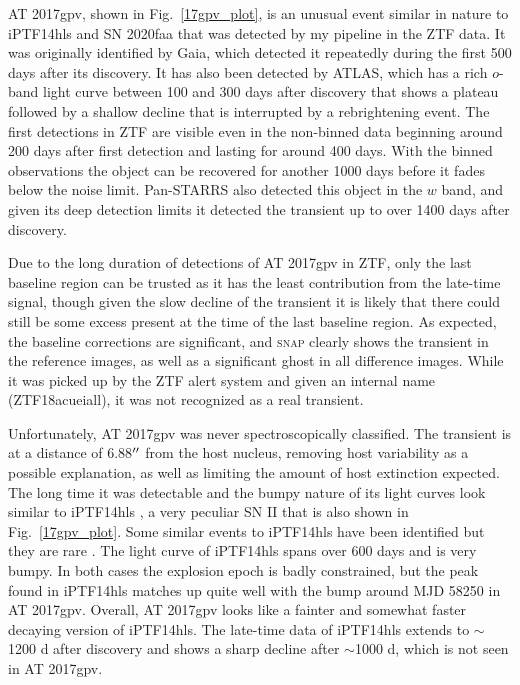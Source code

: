 \documentclass[a4paper,oneside,12pt, class=Latex/Classes/PhDthesisPSnPDF, crop=false]{standalone}
\begin{document}
AT 2017gpv, shown in Fig.~\ref{17gpv_plot}, is an unusual event similar in nature to iPTF14hls \citep{iPTF14hls_Iair, Sollerman_2019_iptf14hls} and SN 2020faa \citep{Yang_2021_20faa} that was detected by my pipeline in the ZTF data. It was originally identified by Gaia, which detected it repeatedly during the first 500 days after its discovery. It has also been detected by ATLAS, which has a rich $o$-band light curve between 100 and 300 days after discovery that shows a plateau followed by a shallow decline that is interrupted by a rebrightening event. The first detections in ZTF are visible even in the non-binned data beginning around 200 days after first detection and lasting for around 400 days. With the binned observations the object can be recovered for another 1000 days before it fades below the noise limit. Pan-STARRS also detected this object in the $w$ band, and given its deep detection limits it detected the transient up to over 1400 days after discovery.

Due to the long duration of detections of AT 2017gpv in ZTF, only the last baseline region can be trusted as it has the least contribution from the late-time signal, though given the slow decline of the transient it is likely that there could still be some excess present at the time of the last baseline region. As expected, the baseline corrections are significant, and \textsc{snap} clearly shows the transient in the reference images, as well as a significant ghost in all difference images. While it was picked up by the ZTF alert system and given an internal name (ZTF18acueiall), it was not recognized as a real transient.

Unfortunately, AT 2017gpv was never spectroscopically classified. The transient is at a distance of 6.88$^{\prime\prime}$ from the host nucleus, removing host variability as a possible explanation, as well as limiting the amount of host extinction expected. The long time it was detectable and the bumpy nature of its light curves look similar to iPTF14hls \citep{iPTF14hls_Iair,Sollerman_2019_iptf14hls}, a very peculiar SN II that is also shown in Fig.~\ref{17gpv_plot}. Some similar events to iPTF14hls have been identified but they are rare \citep{Yang_2021_20faa, Soraisam_2022}. The light curve of iPTF14hls spans over 600 days and is very bumpy. In both cases the explosion epoch is badly constrained, but the peak found in iPTF14hls matches up quite well with the bump around MJD 58250 in AT 2017gpv. Overall, AT 2017gpv looks like a fainter and somewhat faster decaying version of iPTF14hls. The late-time data of iPTF14hls \citep{Sollerman_2019_iptf14hls} extends to $\sim$1200 d after discovery and shows a sharp decline after $\sim$1000 d, which is not seen in AT 2017gpv.
\end{document}

